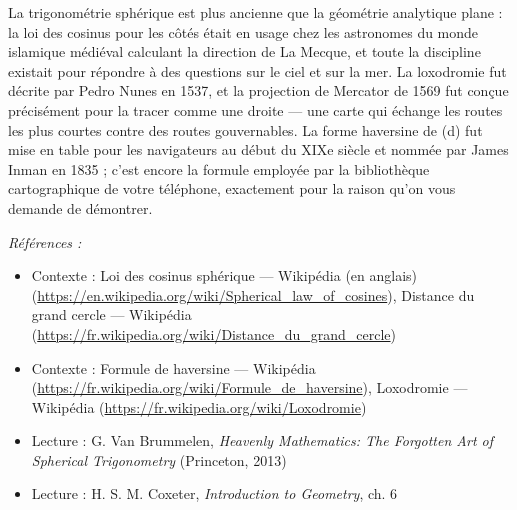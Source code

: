 \documentclass[11pt]{article}
\newenvironment{refs}{\par\small\noindent\emph{Références :}\begin{itemize}\setlength\itemsep{0pt}}{\end{itemize}\normalsize}
\begin{document}
\noindent La trigonométrie sphérique est plus ancienne que la géométrie analytique plane :
la loi des cosinus pour les côtés était en usage chez les astronomes du monde islamique médiéval
calculant la direction de La Mecque, et toute la discipline existait pour répondre à des questions
sur le ciel et sur la mer. La loxodromie fut décrite par Pedro Nunes en 1537, et la projection de
Mercator de 1569 fut conçue précisément pour la tracer comme une droite --- une carte qui échange les
routes les plus courtes contre des routes gouvernables. La forme haversine de (d) fut mise en table
pour les navigateurs au début du XIXe siècle et nommée par James Inman en 1835 ; c'est
encore la formule employée par la bibliothèque cartographique de votre téléphone, exactement pour
la raison qu'on vous demande de démontrer.

\begin{refs}
\item Contexte : Loi des cosinus sphérique --- Wikipédia (en anglais) (\url{https://en.wikipedia.org/wiki/Spherical_law_of_cosines}), Distance du grand cercle --- Wikipédia (\url{https://fr.wikipedia.org/wiki/Distance_du_grand_cercle})
\item Contexte : Formule de haversine --- Wikipédia (\url{https://fr.wikipedia.org/wiki/Formule_de_haversine}), Loxodromie --- Wikipédia (\url{https://fr.wikipedia.org/wiki/Loxodromie})
\item Lecture : G. Van Brummelen, \textit{Heavenly Mathematics: The Forgotten Art of Spherical Trigonometry} (Princeton, 2013)
\item Lecture : H. S. M. Coxeter, \textit{Introduction to Geometry}, ch. 6
\end{refs}

\bigskip
\end{document}
